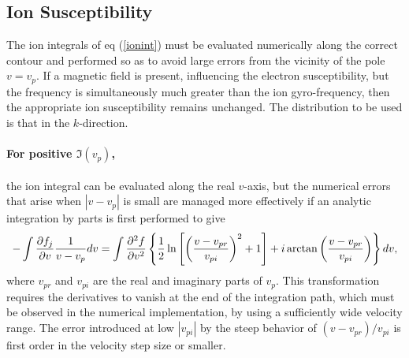 \documentclass[12pt]{article}
\begin{document}

\subsection{Ion Susceptibility}

The ion integrals of eq (\ref{ionint}) must be evaluated numerically
along the correct contour and performed so as to avoid large errors
from the vicinity of the pole $v=v_p$. If a magnetic field is present,
influencing the electron susceptibility, but the frequency is
simultaneously much greater than the ion gyro-frequency, then the
appropriate ion susceptibility remains unchanged. The distribution to
be used is that in the $k$-direction.


\paragraph{For positive $\Im(v_p)$,} the ion integral can be evaluated along the real $v$-axis, but
the numerical errors that arise when $|v-v_p|$ is small are managed more
effectively if an analytic integration by parts is first performed to
give
\begin{equation}
-\int  {\partial
    f_j\over \partial v } {1\over v- v_p} dv =  
\int{\partial^2 f\over \partial v^2} 
\left\{ {1\over 2} \ln\left[\left(v-v_{pr}\over v_{pi}\right)^2+1\right] 
+ i \arctan\left(v-v_{pr}\over v_{pi}\right) \right\} dv ,
\end{equation}
where $v_{pr}$ and $v_{pi}$ are the real and imaginary parts of
$v_p$. This transformation requires the derivatives to vanish at the
end of the integration path, which must be observed in the numerical
implementation, by using a sufficiently wide velocity range. The error
introduced at low $|v_{pi}|$ by the steep behavior of
$(v-v_{pr})/v_{pi}$ is first order in the velocity step size or
smaller.
\end{document}
